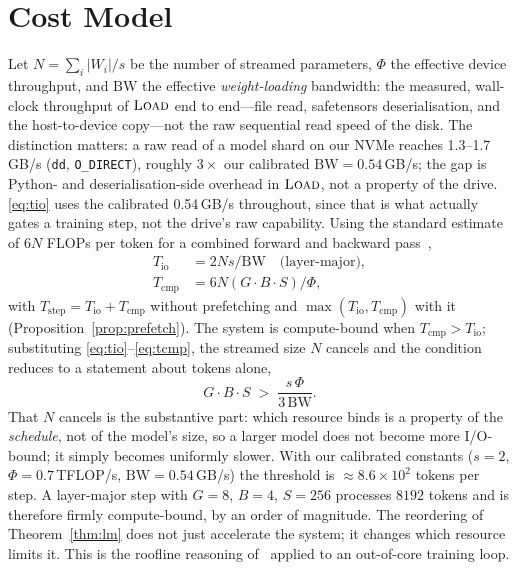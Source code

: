 \documentclass[preprint,12pt]{elsarticle}
\begin{document}
\section{Cost Model}
\label{sec:cost}

Let $N = \sum_i |W_i| / s$ be the number of streamed parameters, $\Phi$ the effective device
throughput, and $\mathrm{BW}$ the effective \emph{weight-loading} bandwidth: the measured, wall-clock
throughput of $\textsc{Load}$ end to end---file read, safetensors deserialisation, and the
host-to-device copy---not the raw sequential read speed of the disk. The distinction matters: a raw
read of a model shard on our NVMe reaches 1.3--1.7\,GB/s (\texttt{dd}, \texttt{O\_DIRECT}), roughly
$3\times$ our calibrated $\mathrm{BW}=0.54$\,GB/s; the gap is Python- and
deserialisation-side overhead in $\textsc{Load}$, not a property of the drive. \eqref{eq:tio}
uses the calibrated 0.54\,GB/s throughout, since that is what actually gates a training step, not
the drive's raw capability.
Using the standard estimate of $6N$ FLOPs
per token for a combined forward and backward pass~\cite{kaplan2020scaling},
\begin{align}
T_{\text{io}}  &= 2Ns/\mathrm{BW} \quad \text{(layer-major)}, \label{eq:tio}\\
T_{\text{cmp}} &= 6N (G\cdot B\cdot S)/\Phi, \label{eq:tcmp}
\end{align}
with $T_{\text{step}} = T_{\text{io}} + T_{\text{cmp}}$ without prefetching and
$\max(T_{\text{io}}, T_{\text{cmp}})$ with it (Proposition~\ref{prop:prefetch}). The system is compute-bound
when $T_{\text{cmp}} > T_{\text{io}}$; substituting \eqref{eq:tio}--\eqref{eq:tcmp}, the streamed
size $N$ cancels and the condition reduces to a statement about tokens alone,
\begin{equation}
\label{eq:regime}
G\cdot B\cdot S \;>\; \frac{s\,\Phi}{3\,\mathrm{BW}} .
\end{equation}
That $N$ cancels is the substantive part: which resource binds is a property of the \emph{schedule},
not of the model's size, so a larger model does not become more I/O-bound; it simply becomes uniformly
slower. With our calibrated constants ($s=2$, $\Phi = 0.7$\,TFLOP/s, $\mathrm{BW}=0.54$\,GB/s) the
threshold is $\approx 8.6\times 10^{2}$ tokens per step. A layer-major step with $G=8$, $B=4$,
$S=256$ processes $8192$ tokens and is therefore firmly compute-bound, by an order of
magnitude. The reordering of Theorem~\ref{thm:lm} does not just accelerate the system; it changes which
resource limits it. This is the roofline reasoning of~\cite{williams2009roofline} applied to an
out-of-core training loop.
\end{document}
